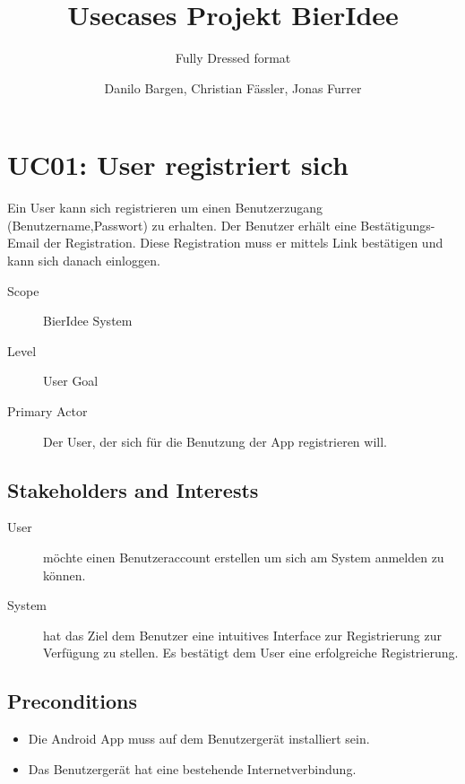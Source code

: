 \documentclass[10pt,a4paper]{scrartcl}
\author{Danilo Bargen, Christian Fässler, Jonas Furrer}
\title{Usecases Projekt BierIdee}
\subtitle{Fully Dressed format}
\begin{document}
\begin{titlepage}
	\maketitle
	\vspace{120mm}
	\thispagestyle{empty} %
\end{titlepage}



\section*{UC01: User registriert sich }

Ein User kann sich registrieren um einen Benutzerzugang (Benutzername,Passwort) zu erhalten. Der Benutzer erhält eine Bestätigungs-Email der Registration.
Diese Registration muss er mittels Link bestätigen und kann sich danach einloggen.



\begin{description}
\item[Scope] BierIdee System
\item[Level] User Goal
\item[Primary Actor] Der User, der sich für die Benutzung der App registrieren will.
\end{description}


\subsection*{Stakeholders and Interests}

\begin{description}
\item[User] möchte einen Benutzeraccount erstellen um sich am System anmelden zu können.
\item[System] hat das Ziel dem Benutzer eine intuitives Interface zur Registrierung zur Verfügung zu stellen. Es bestätigt dem User eine erfolgreiche Registrierung.
\end{description}


\subsection*{Preconditions}

\begin{itemize}
\item Die Android App muss auf dem Benutzergerät installiert sein.
\item Das Benutzergerät hat eine bestehende Internetverbindung.
\end{itemize}
\end{document}
